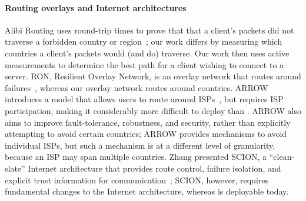 \paragraph{Routing overlays and Internet architectures} Alibi Routing uses
round-trip times to prove that that a client's packets did  not traverse a
forbidden country or region~\cite{levin2015alibi,levin_detour}; our work differs by
measuring  which countries a client's packets would (and do) traverse.  Our
work then  uses active measurements to determine the best path for a client
wishing  to connect to a server.  RON, Resilient Overlay Network, is an
overlay network that  routes around failures~\cite{andersen2001resilient}, whereas our overlay network
routes around countries.  ARROW introduces a
model that allows users to route around ISPs~\cite{peter2015one}, but requires
ISP participation, making it considerably more difficult to deploy than
\system{}. ARROW also aims to improve fault-tolerance, robustness, and
security, rather than explicitly attempting to avoid certain countries; ARROW
provides mechanisms to avoid individual ISPs, but such a mechanism is at a
different level of granularity, because an ISP may span multiple countries.
Zhang \ea{} presented SCION, a ``clean-slate'' Internet architecture that
provides route control, failure isolation, and explicit trust information for
communication~\cite{zhang2011scion}; SCION, however, requires fundamental
changes to the Internet architecture, whereas \system{} is deployable today.


